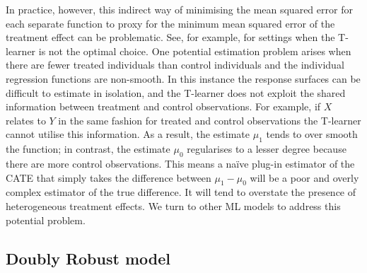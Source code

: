 \documentclass[12pt, a4paper]{article}
\begin{document}
In practice, however, this indirect way of minimising the mean squared error
for each separate function to proxy for the minimum mean squared error of the
treatment effect can be problematic. See, for example,
\cite{kunzel2019,kennedy2020} for settings when the T-learner is not the
optimal choice. One potential estimation problem arises when there are fewer
treated individuals than control individuals and the individual regression
functions are non-smooth. In this instance the response surfaces can be
difficult to estimate in isolation, and the T-learner does not exploit the
shared information between treatment and control observations. For example, if
$X$ relates to $Y$ in the same fashion for treated and control observations the
T-learner cannot utilise this information. As a result, the estimate $\mu_1$
tends to over smooth the function; in contrast, the estimate $\mu_0$
regularises to a lesser degree because there are more control observations.
This means a na\"ive plug-in estimator of the CATE that simply takes the
difference between $\mu_1 - \mu_0$ will be a poor and overly complex estimator
of the true difference. It will tend to overstate the presence of heterogeneous
treatment effects. We turn to other ML models to address this potential
problem.

\subsection{Doubly Robust model}
\end{document}
